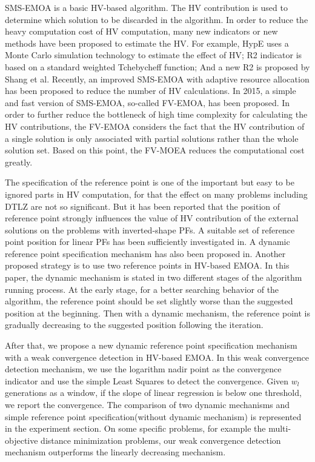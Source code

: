 \documentclass[conference]{IEEEtran}
\begin{document}
SMS-EMOA\cite{smsemoa} is a basic HV-based algorithm. 
The HV contribution is used to determine which solution to be discarded in the algorithm. 
In order to reduce the heavy computation cost of HV computation, 
many new indicators or new methods have been proposed to estimate the HV. 
For example, HypE\cite{HypE} uses a Monte Carlo simulation technology to estimate the effect of HV; 
R2\cite{R2} indicator is based on a standard weighted Tchebycheff function; 
And a new R2\cite{newR2} is proposed by Shang et al. 
Recently, an improved SMS-EMOA with adaptive resource allocation has been proposed to reduce the number of HV calculations\cite{ismsemoa}.  
In 2015, a simple and fast version of SMS-EMOA\cite{smsemoa}, so-called FV-EMOA, has been proposed\cite{FVEMOA}.
In order to further reduce the bottleneck of high time complexity for calculating the HV contributions, 
the FV-EMOA considers the fact that the HV contribution of a single solution 
is only associated with partial solutions rather than the whole solution set\cite{FVEMOA}. 
Based on this point, the FV-MOEA reduces the computational cost greatly. 

The specification of the reference point is one of the important but easy to be ignored parts in HV computation, 
for that the effect on many problems including DTLZ\cite{DTLZ} are not so significant. 
But it has been reported that the position of reference point strongly influences the value of
HV contribution of the external solutions on the problems with inverted-shape PFs\cite{hisao:RPhowtoSpecify, hisao:RPspecify, hisao:RPexplanation}. 
A suitable set of reference point position for linear PFs has been sufficiently investigated in\cite{hisao:RPspecify}.
A dynamic reference point specification mechanism has also been proposed in\cite{hisao:dynamic}.
Another proposed strategy is to use two reference points in HV-based EMOA\cite{hisao:twoRP}. 
In this paper, the dynamic mechanism is stated in two different stages of the algorithm running process. 
At the early stage, for a better searching behavior of the algorithm, 
the reference point should be set slightly worse than the suggested position at the beginning.
Then with a dynamic mechanism, the reference point is gradually decreasing to the suggested position following the iteration. 

After that, we propose a new dynamic reference point specification mechanism with a weak convergence detection in HV-based EMOA. 
In this weak convergence detection mechanism, we use the logarithm nadir point as the convergence indicator
and use the simple Least Squares\cite{SimpleLeastSquares} to detect the convergence. 
Given $w_l$ generations as a window, if the slope of linear regression is below one threshold, we report the convergence.
The comparison of two dynamic mechanisms and simple reference point specification(without dynamic mechanism) is 
represented in the experiment section. On some specific problems, for example the multi-objective distance minimization problems\cite{dmp},
our weak convergence detection mechanism outperforms the linearly decreasing mechanism. 
\end{document}
